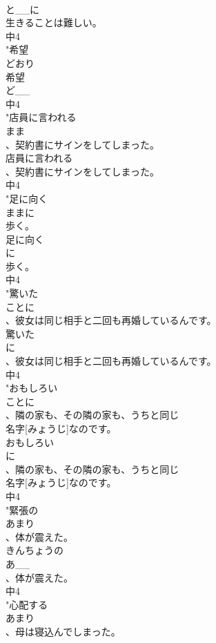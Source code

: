 \documentclass[8pt]{extreport}
\begin{document}
\begin{CJK}{UTF8}{min}
\\	と__に
\\	生きることは難しい。
\\	中4
\\	"希望
\\	どおり
\\	希望
\\	ど__
\\	中4
\\	"店員に言われる
\\	まま
\\	、契約書にサインをしてしまった。
\\	店員に言われる
\\	、契約書にサインをしてしまった。
\\	中4
\\	"足に向く
\\	ままに
\\	歩く。
\\	足に向く
\\	に
\\	歩く。
\\	中4
\\	"驚いた
\\	ことに
\\	、彼女は同じ相手と二回も再婚しているんです。
\\	驚いた
\\	に
\\	、彼女は同じ相手と二回も再婚しているんです。
\\	中4
\\	"おもしろい
\\	ことに
\\	、隣の家も、その隣の家も、うちと同じ
\\	名字[みょうじ]なのです。
\\	おもしろい
\\	に
\\	、隣の家も、その隣の家も、うちと同じ
\\	名字[みょうじ]なのです。
\\	中4
\\	"緊張の
\\	あまり
\\	、体が震えた。
\\	きんちょうの
\\	あ__
\\	、体が震えた。
\\	中4
\\	"心配する
\\	あまり
\\	、母は寝込んでしまった。

\end{CJK}
\end{document}
